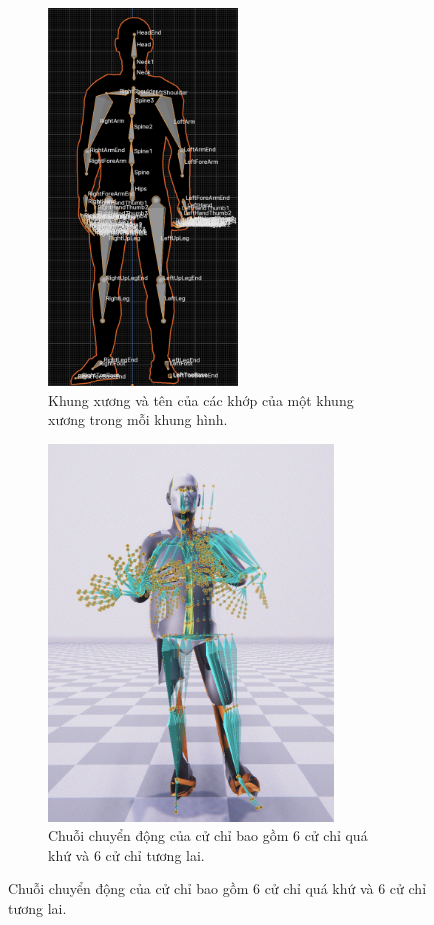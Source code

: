 \begin{figure}[htbp]
	\centering
	\begin{subfigure}{0.45\textwidth}
		\centering
		\includegraphics[height=10cm]{images/Skeleton.png}
		\caption{Khung xương và tên của các khớp của một khung xương trong mỗi khung hình.}
		\label{fig:Skeleton}
	\end{subfigure}
	\hfill
	\begin{subfigure}{0.45\textwidth}
		\centering
		\includegraphics[height=10cm]{images/MotionPastAndFuture.png}
		\caption{Chuỗi chuyển động của cử chỉ bao gồm 6 cử chỉ quá khứ và 6 cử chỉ tương lai.}
		\label{fig:MotionPastAndFuture}
	\end{subfigure}
\end{figure}


